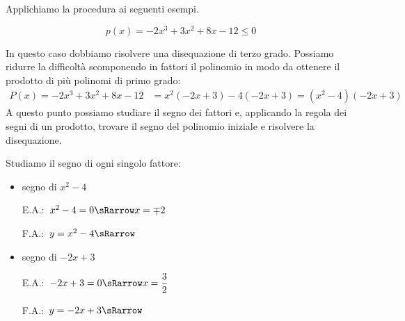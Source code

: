 Applichiamo la procedura ai seguenti esempi.

\newpage %

\begin{esempio}
 \[p(x)=-2x^3+3x^2+8x-12 \le 0\]

In questo caso dobbiamo risolvere una disequazione di terzo grado.
Possiamo ridurre la difficoltà scomponendo in fattori il polinomio in modo da
ottenere il prodotto di più polinomi di primo grado:
\begin{align*}
P(x) = -2x^3+3x^2+8x-12 &= x^2(-2x+3)-4(-2x+3) = (x^2-4)(-2x+3)
\end{align*}
A questo punto possiamo studiare il segno dei fattori e, applicando la regola
dei segni di un prodotto, trovare il segno del polinomio iniziale e risolvere
la disequazione.

Studiamo il segno di ogni singolo fattore:
\begin{itemize}

 \item segno di \(x^2-4\)\\
 \begin{minipage}{.35\textwidth}
  E.A.:~\(x^2-4=0 \sRarrow x=\mp 2\)
 \end{minipage}
 \begin{minipage}{.25\textwidth}
  F.A.:~\(y=x^2-4 \sRarrow\)
 \end{minipage}
 \begin{minipage}{.38\textwidth}
  \begin{inaccessibleblock}
\end{inaccessibleblock}
 \end{minipage}

 \item  segno di \(-2x+3\)\\
 \begin{minipage}{.35\textwidth}
  E.A.:~\(-2x+3=0 \sRarrow x=\dfrac{3}{2}\)
  \vspace{1.8em}
 \end{minipage}
 \begin{minipage}{.25\textwidth}
  F.A.:~\(y=-2x+3 \sRarrow \)
  \vspace{1.8em}
 \end{minipage}
 \begin{minipage}{.38\textwidth}
  \begin{inaccessibleblock}
\end{inaccessibleblock}
 \end{minipage}


\end{itemize}
\end{esempio}
